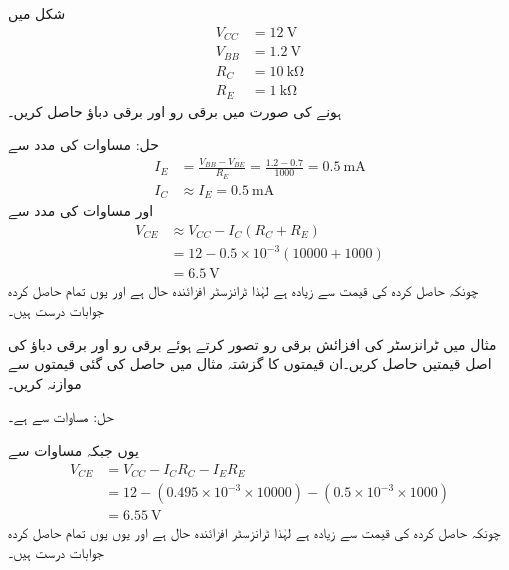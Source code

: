 شکل   میں 
\begin{align*}
V_{CC}&=\SI{12}{\volt} \\
V_{BB}&=\SI{1.2}{\volt} \\
R_C& = \SI{10}{\kilo \ohm}\\
R_E&=\SI{1}{\kilo \ohm}
\end{align*}
ہونے کی صورت میں برقی رو  اور برقی دباؤ  حاصل کریں۔

حل:	مساوات   کی مدد سے
\begin{align*}
I_E&=\frac{V_{BB}-V_{BE}}{R_E} = \frac{1.2-0.7}{1000}=\SI{0.5}{\milli \ampere}\\
I_C& \approx I_E = \SI{0.5}{\milli \ampere}
\end{align*}
اور مساوات   کی مدد سے
\begin{align*}
V_{CE} & \approx V_{CC}-I_C (R_C+R_E)\\
& =12-0.5 \times 10^{-3} (10000+1000)\\
&=\SI{6.5}{\volt}
\end{align*}
	چونکہ حاصل کردہ  کی قیمت سے زیادہ ہے لہٰذا ٹرانزسٹر افزائندہ حال ہے اور یوں تمام حاصل کردہ جوابات درست ہیں۔


مثال  میں ٹرانزسٹر کی افزائش برقی رو  تصور کرتے ہوئے برقی رو  اور برقی دباؤ  کی اصل قیمتیں حاصل کریں۔ان قیمتوں کا گزشتہ مثال میں حاصل کی گئی قیمتوں سے موازنہ کریں۔

حل:
	مساوات   سے   ہے۔

یوں جبکہ مساوات    سے
\begin{align*}
V_{CE} &= V_{CC} -I_C R_C - I_E R_E\\
&=12-(0.495 \times 10^{-3} \times 10000)-(0.5 \times 10^{-3} \times 1000)\\
&=\SI{6.55}{\volt}
\end{align*}
چونکہ حاصل کردہ  کی قیمت  سے زیادہ ہے لہٰذا ٹرانزسٹر  افزائندہ حال ہے اور یوں یوں تمام حاصل کردہ جوابات درست ہیں۔

